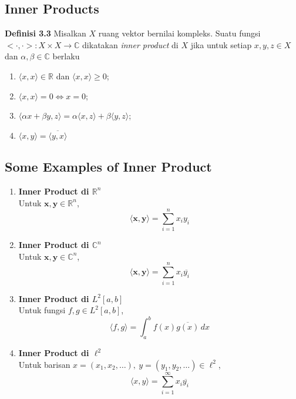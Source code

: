 \documentclass{article}
\newcommand{\R}{\mathbb{R}}
\newcommand{\C}{\mathbb{C}}
\begin{document}
\begin{multicols}{2}
  \subsection*{Inner Products}
  \vspace{-1em}
  \textbf{Definisi 3.3} Misalkan $X$ ruang vektor bernilai kompleks. Suatu fungsi $<\cdot,
    \cdot>:X\times X\to\C$ dikatakan \textit{inner product} di $X$ jika untuk setiap $x,y,z\in X$ dan $\alpha,\beta\in \C$ berlaku
  \begin{enumerate}[label=(\roman*)]
    \item $\langle x,x\rangle\in\R$ dan $\langle x,x\rangle\geq0$;
    \item $\langle x,x\rangle=0\iff x=0$;
    \item $\langle\alpha x+\beta y,z\rangle=\alpha\langle x,z\rangle+\beta\langle y,z\rangle$;
    \item $\langle x,y\rangle=\overline{\langle y,x\rangle}$
  \end{enumerate}
  \vspace{-1em}
  \subsection*{Some Examples of Inner Product}
  \begin{enumerate}
    \item \textbf{Inner Product di \( \mathbb{R}^n \)}\\
          Untuk \( \mathbf{x}, \mathbf{y} \in \mathbb{R}^n \),
          \[
            \langle \mathbf{x}, \mathbf{y} \rangle = \sum_{i=1}^{n} x_i y_i
          \]

    \item \textbf{Inner Product di \( \mathbb{C}^n \)}\\
          Untuk \( \mathbf{x}, \mathbf{y} \in \mathbb{C}^n \),
          \[
            \langle \mathbf{x}, \mathbf{y} \rangle = \sum_{i=1}^{n} x_i \overline{y_i}
          \]

    \item \textbf{Inner Product di \( L^2[a, b] \)}\\
          Untuk fungsi \( f, g \in L^2[a, b] \),
          \[
            \langle f, g \rangle = \int_a^b f(x) \overline{g(x)} \, dx
          \]

    \item \textbf{Inner Product di \( \ell^2 \)}\\
          Untuk barisan \( x = (x_1, x_2, \dots),\ y = (y_1, y_2, \dots) \in \ell^2 \),
          \[
            \langle x, y \rangle = \sum_{i=1}^{\infty} x_i \overline{y_i}
          \]


\end{enumerate}
\end{multicols}
\end{document}
